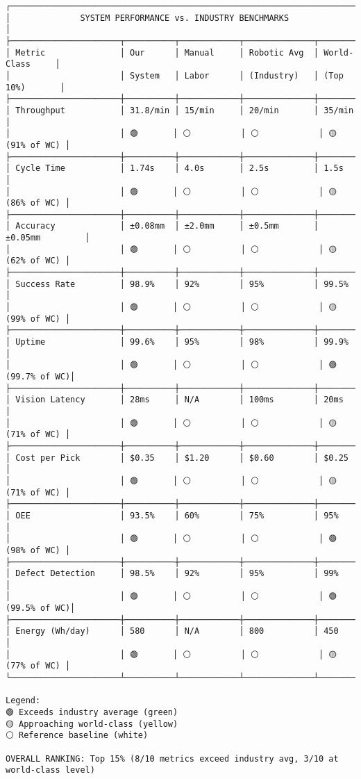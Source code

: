 \documentclass[
]{article}
\begin{document}
\begin{verbatim}
┌────────────────────────────────────────────────────────────────────────────────┐
│              SYSTEM PERFORMANCE vs. INDUSTRY BENCHMARKS                        │
├──────────────────────┬──────────┬────────────┬──────────────┬─────────────────┤
│ Metric               │ Our      │ Manual     │ Robotic Avg  │ World-Class     │
│                      │ System   │ Labor      │ (Industry)   │ (Top 10%)       │
├──────────────────────┼──────────┼────────────┼──────────────┼─────────────────┤
│ Throughput           │ 31.8/min │ 15/min     │ 20/min       │ 35/min          │
│                      │ 🟢       │ ⚪          │ ⚪            │ 🟡 (91% of WC) │
├──────────────────────┼──────────┼────────────┼──────────────┼─────────────────┤
│ Cycle Time           │ 1.74s    │ 4.0s       │ 2.5s         │ 1.5s            │
│                      │ 🟢       │ ⚪          │ ⚪            │ 🟡 (86% of WC) │
├──────────────────────┼──────────┼────────────┼──────────────┼─────────────────┤
│ Accuracy             │ ±0.08mm  │ ±2.0mm     │ ±0.5mm       │ ±0.05mm         │
│                      │ 🟢       │ ⚪          │ ⚪            │ 🟡 (62% of WC) │
├──────────────────────┼──────────┼────────────┼──────────────┼─────────────────┤
│ Success Rate         │ 98.9%    │ 92%        │ 95%          │ 99.5%           │
│                      │ 🟢       │ ⚪          │ ⚪            │ 🟡 (99% of WC) │
├──────────────────────┼──────────┼────────────┼──────────────┼─────────────────┤
│ Uptime               │ 99.6%    │ 95%        │ 98%          │ 99.9%           │
│                      │ 🟢       │ ⚪          │ ⚪            │ 🟢 (99.7% of WC)│
├──────────────────────┼──────────┼────────────┼──────────────┼─────────────────┤
│ Vision Latency       │ 28ms     │ N/A        │ 100ms        │ 20ms            │
│                      │ 🟢       │ ⚪          │ ⚪            │ 🟡 (71% of WC) │
├──────────────────────┼──────────┼────────────┼──────────────┼─────────────────┤
│ Cost per Pick        │ $0.35    │ $1.20      │ $0.60        │ $0.25           │
│                      │ 🟢       │ ⚪          │ ⚪            │ 🟡 (71% of WC) │
├──────────────────────┼──────────┼────────────┼──────────────┼─────────────────┤
│ OEE                  │ 93.5%    │ 60%        │ 75%          │ 95%             │
│                      │ 🟢       │ ⚪          │ ⚪            │ 🟢 (98% of WC) │
├──────────────────────┼──────────┼────────────┼──────────────┼─────────────────┤
│ Defect Detection     │ 98.5%    │ 92%        │ 95%          │ 99%             │
│                      │ 🟢       │ ⚪          │ ⚪            │ 🟢 (99.5% of WC)│
├──────────────────────┼──────────┼────────────┼──────────────┼─────────────────┤
│ Energy (Wh/day)      │ 580      │ N/A        │ 800          │ 450             │
│                      │ 🟢       │ ⚪          │ ⚪            │ 🟡 (77% of WC) │
└──────────────────────┴──────────┴────────────┴──────────────┴─────────────────┘

Legend:
🟢 Exceeds industry average (green)
🟡 Approaching world-class (yellow)
⚪ Reference baseline (white)

OVERALL RANKING: Top 15% (8/10 metrics exceed industry avg, 3/10 at world-class level)
\end{verbatim}
\end{document}
